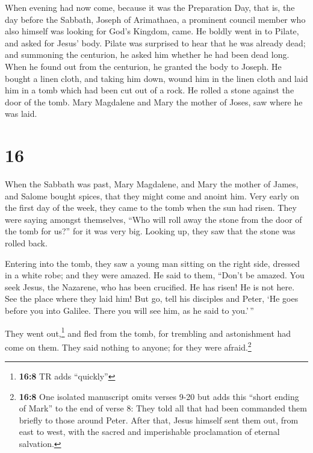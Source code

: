  When evening had now come, because it was the
Preparation Day, that is, the day before the Sabbath, 
Joseph of Arimathaea, a prominent council member who also himself was
looking for God's Kingdom, came. He boldly went in to Pilate, and asked
for Jesus' body.  Pilate was surprised to hear that he
was already dead; and summoning the centurion, he asked him whether he
had been dead long.  When he found out from the
centurion, he granted the body to Joseph.  He bought a
linen cloth, and taking him down, wound him in the linen cloth and laid
him in a tomb which had been cut out of a rock. He rolled a stone
against the door of the tomb.  Mary Magdalene and Mary
the mother of Joses, saw where he was laid.

\hypertarget{section-15}{%
\section{16}\label{section-15}}

 When the Sabbath was past, Mary Magdalene, and Mary the
mother of James, and Salome bought spices, that they might come and
anoint him.  Very early on the first day of the week, they
came to the tomb when the sun had risen.  They were saying
amongst themselves, ``Who will roll away the stone from the door of the
tomb for us?''  for it was very big. Looking up, they saw
that the stone was rolled back.

 Entering into the tomb, they saw a young man sitting on
the right side, dressed in a white robe; and they were amazed.
 He said to them, ``Don't be amazed. You seek Jesus, the
Nazarene, who has been crucified. He has risen! He is not here. See the
place where they laid him!  But go, tell his disciples and
Peter, `He goes before you into Galilee. There you will see him, as he
said to you.'\,''

 They went out,\footnote{\textbf{16:8} TR adds ``quickly''}
and fled from the tomb, for trembling and astonishment had come on them.
They said nothing to anyone; for they were afraid.\footnote{\textbf{16:8}
  One isolated manuscript omits verses 9-20 but adds this ``short ending
  of Mark'' to the end of verse 8: They told all that had been commanded
  them briefly to those around Peter. After that, Jesus himself sent
  them out, from east to west, with the sacred and imperishable
  proclamation of eternal salvation.}

